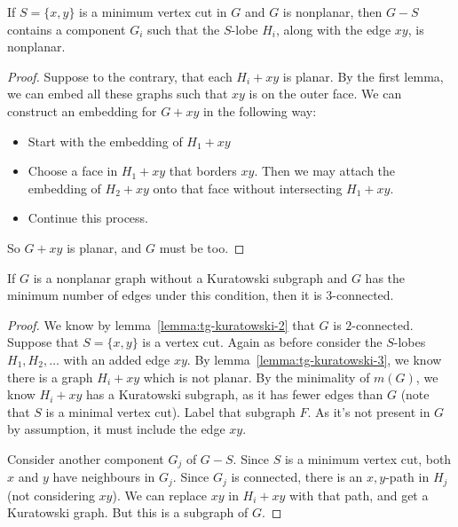\begin{lemma}
  \label{lemma:tg-kuratowski-3}
  If $S= \{x,y\}$ is a minimum vertex cut in $G$ and $G$ is nonplanar, then
  $G-S$ contains a component $G_i$ such that the $S$-lobe $H_i$, along with the
  edge $xy$, is nonplanar.
\end{lemma}

\begin{proof}
  Suppose to the contrary, that each $H_i + xy$ is planar.
  By the first lemma, we can embed all these graphs such that $xy$ is on the
  outer face.
  We can construct an embedding for $G+xy$ in the following way:
  \begin{itemize}
  \item Start with the embedding of $H_1 + xy$
  \item Choose a face in $H_1 + xy$ that borders $xy$.
	Then we may attach the embedding of $H_2 + xy$ onto that face without
	intersecting $H_1 + xy$.
  \item Continue this process.
  \end{itemize}
  So $G + xy$ is planar, and $G$ must be too.
\end{proof}

\begin{lemma}
  \label{lemma:tg-kuratowski-4}
  If $G$ is a nonplanar graph without a Kuratowski subgraph and $G$ has the
  minimum number of edges under this condition, then it is $3$-connected.
\end{lemma}

\begin{proof}
  We know by lemma~\ref{lemma:tg-kuratowski-2} that $G$ is $2$-connected.
  Suppose that $S = \{x,y\}$ is a vertex cut.
  Again as before consider the $S$-lobes $H_1, H_2, \ldots$ with an added edge
  $xy$.
  By lemma~\ref{lemma:tg-kuratowski-3}, we know there is a graph $H_i + xy$
  which is not planar.
  By the minimality of $m(G)$, we know $H_i + xy$ has a Kuratowski subgraph, as
  it has fewer edges than $G$ (note that $S$ is a minimal vertex cut).
  Label that subgraph $F$.
  As it's not present in $G$ by assumption, it must include the edge $xy$.

  Consider another component $G_j$ of $G - S$.
  Since $S$ is a minimum vertex cut, both $x$ and $y$ have neighbours in $G_j$.
  Since $G_j$ is connected, there is an $x,y$-path in $H_j$ (not considering
  $xy$).
  We can replace $xy$ in $H_i + xy$ with that path, and get a Kuratowski graph.
  But this is a subgraph of $G$.
\end{proof}

